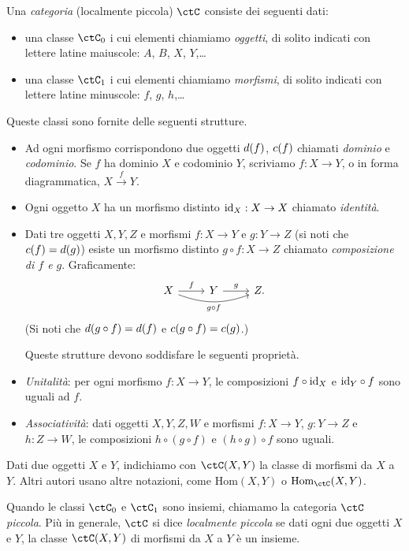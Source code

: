 \begin{definition}
 Una \emph{categoria} (localmente piccola) $\ctC$ consiste dei seguenti dati:
 \begin{itemize}
  \item una classe $\ctC_0$ i cui elementi chiamiamo \emph{oggetti}, di solito indicati con lettere latine maiuscole: $A$, $B$, $X$, $Y$,\dots
  \item una classe $\ctC_1$ i cui elementi chiamiamo \emph{morfismi}, di solito indicati con lettere latine minuscole: $f$, $g$, $h$,\dots
 \end{itemize}
 Queste classi sono fornite delle seguenti strutture.
 \begin{itemize}
  \item Ad ogni morfismo corrispondono due oggetti $d(f)$, $c(f)$ chiamati \emph{dominio} e \emph{codominio}. Se $f$ ha dominio $X$ e codominio $Y$, scriviamo $f:X\to Y$, o in forma diagrammatica, $X \xrightarrow{f} Y$.
  \item Ogni oggetto $X$ ha un morfismo distinto $\mathrm{id}_X:X\to X$ chiamato \emph{identità}.
  \item Dati tre oggetti $X,Y,Z$ e morfismi $f:X\to Y$ e $g:Y\to Z$ (si noti che $c(f)=d(g)$) esiste un morfismo distinto $g\circ f:X\to Z$ chiamato \emph{composizione di $f$ e $g$}. Graficamente:
  \[
  \begin{tikzcd}
   X \ar{r}{f} \ar[bend right=20]{rr}[swap]{g\circ f} & Y \ar{r}{g} & Z .
  \end{tikzcd}
  \]
  (Si noti che $d(g\circ f)=d(f)$ e $c(g\circ f)=c(g)$.)

  Queste strutture devono soddisfare le seguenti proprietà.

  \item \emph{Unitalità}: per ogni morfismo $f:X\to Y$, le composizioni $f\circ\mathrm{id}_X$ e $\mathrm{id}_Y\circ f$ sono uguali ad $f$.
  \item \emph{Associatività}: dati oggetti $X,Y,Z,W$ e morfismi $f:X\to Y$, $g:Y\to Z$ e $h:Z\to W$, le composizioni $h\circ (g\circ f)$ e $(h\circ g)\circ f$ sono uguali.
 \end{itemize}
\end{definition}

Dati due oggetti $X$ e $Y$, indichiamo con $\Hom{\ctC}(X,Y)$ la classe di morfismi da $X$ a $Y$. Altri autori usano altre notazioni, come $\mathrm{Hom}(X,Y)$ o $\mathrm{Hom}_\ctC(X,Y)$.


Quando le classi $\ctC_0$ e $\ctC_1$ sono insiemi, chiamamo la categoria $\ctC$ \emph{piccola}. Più in generale, $\ctC$ si dice \emph{localmente piccola} se dati ogni due oggetti $X$ e $Y$, la classe $\Hom{\ctC}(X,Y)$ di morfismi da $X$ a $Y$ è un insieme.

